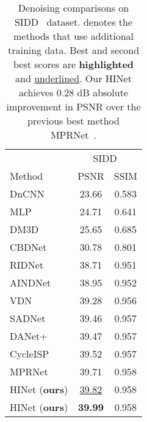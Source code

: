 \documentclass[final]{cvpr}
\newcommand{\tablestyle}[2]{\setlength{\tabcolsep}{#1}\renewcommand{\arraystretch}{#2}\centering\footnotesize}
\begin{document}
\begin{table}
\centering
\tablestyle{5pt}{1.05}\setlength{\tabcolsep}{1.mm}\begin{tabular}{l|cc}
& \multicolumn{2}{|c}{SIDD~\cite{abdelhamed2018high}}\\
Method & PSNR & SSIM\\ 
\hline
DnCNN~\cite{zhang2017beyond}&23.66&0.583\\
MLP~\cite{burger2012image}&24.71&0.641\\
DM3D~\cite{dabov2007image}&25.65&0.685\\
CBDNet~\cite{guo2019toward}&30.78&0.801\\
RIDNet~\cite{anwar2019real}&38.71&0.951\\
AINDNet~\cite{kim2020transfer}&38.95&0.952\\
VDN~\cite{yue2019variational}&39.28&0.956\\
SADNet~\cite{chang2020spatial}&39.46&0.957\\
DANet+~\cite{yue2020dual}&39.47&0.957\\
CycleISP~\cite{Zamir2020CycleISP}&39.52&0.957\\
MPRNet~\cite{Zamir2021MPRNet}&39.71&0.958\\
\hline
HINet (\textbf{ours})&\underline{39.82}&0.958\\
HINet (\textbf{ours})&\textbf{39.99}&0.958\\
\end{tabular}
\vspace{-0.2cm}
\caption{Denoising comparisons on SIDD~\cite{abdelhamed2018high} dataset.  denotes the methods that use additional training data. Best and second best scores are \textbf{highlighted} and \underline{underlined}. Our HINet achieves 0.28 dB absolute improvement in PSNR over the previous best method MPRNet~\cite{Zamir2021MPRNet}.}
\label{tab.SIDD.results}
\vspace{-0.2cm}
\end{table}
\end{document}

